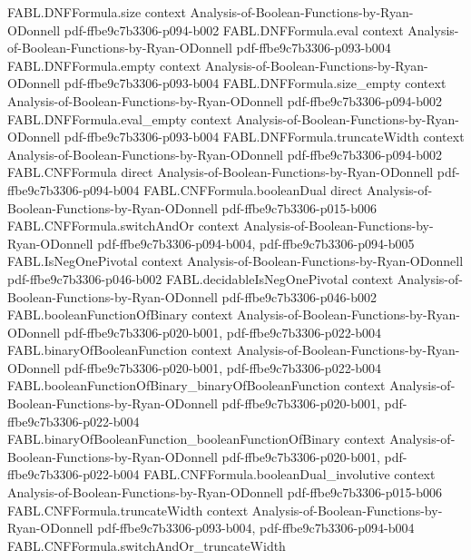 \begin{theorem}
\proofstep
  {FABL.DNFFormula.size}
  {context}
  {Analysis-of-Boolean-Functions-by-Ryan-ODonnell}
  {pdf-ffbe9c7b3306-p094-b002}
\proofstep
  {FABL.DNFFormula.eval}
  {context}
  {Analysis-of-Boolean-Functions-by-Ryan-ODonnell}
  {pdf-ffbe9c7b3306-p093-b004}
\proofstep
  {FABL.DNFFormula.empty}
  {context}
  {Analysis-of-Boolean-Functions-by-Ryan-ODonnell}
  {pdf-ffbe9c7b3306-p093-b004}
\proofstep
  {FABL.DNFFormula.size_empty}
  {context}
  {Analysis-of-Boolean-Functions-by-Ryan-ODonnell}
  {pdf-ffbe9c7b3306-p094-b002}
\proofstep
  {FABL.DNFFormula.eval_empty}
  {context}
  {Analysis-of-Boolean-Functions-by-Ryan-ODonnell}
  {pdf-ffbe9c7b3306-p093-b004}
\proofstep
  {FABL.DNFFormula.truncateWidth}
  {context}
  {Analysis-of-Boolean-Functions-by-Ryan-ODonnell}
  {pdf-ffbe9c7b3306-p094-b002}
\proofstep
  {FABL.CNFFormula}
  {direct}
  {Analysis-of-Boolean-Functions-by-Ryan-ODonnell}
  {pdf-ffbe9c7b3306-p094-b004}
\proofstep
  {FABL.CNFFormula.booleanDual}
  {direct}
  {Analysis-of-Boolean-Functions-by-Ryan-ODonnell}
  {pdf-ffbe9c7b3306-p015-b006}
\proofstep
  {FABL.CNFFormula.switchAndOr}
  {context}
  {Analysis-of-Boolean-Functions-by-Ryan-ODonnell}
  {pdf-ffbe9c7b3306-p094-b004,
    pdf-ffbe9c7b3306-p094-b005}
\proofstep
  {FABL.IsNegOnePivotal}
  {context}
  {Analysis-of-Boolean-Functions-by-Ryan-ODonnell}
  {pdf-ffbe9c7b3306-p046-b002}
\proofstep
  {FABL.decidableIsNegOnePivotal}
  {context}
  {Analysis-of-Boolean-Functions-by-Ryan-ODonnell}
  {pdf-ffbe9c7b3306-p046-b002}
\proofstep
  {FABL.booleanFunctionOfBinary}
  {context}
  {Analysis-of-Boolean-Functions-by-Ryan-ODonnell}
  {pdf-ffbe9c7b3306-p020-b001,
    pdf-ffbe9c7b3306-p022-b004}
\proofstep
  {FABL.binaryOfBooleanFunction}
  {context}
  {Analysis-of-Boolean-Functions-by-Ryan-ODonnell}
  {pdf-ffbe9c7b3306-p020-b001,
    pdf-ffbe9c7b3306-p022-b004}
\proofstep
  {FABL.booleanFunctionOfBinary_binaryOfBooleanFunction}
  {context}
  {Analysis-of-Boolean-Functions-by-Ryan-ODonnell}
  {pdf-ffbe9c7b3306-p020-b001,
    pdf-ffbe9c7b3306-p022-b004}
\proofstep
  {FABL.binaryOfBooleanFunction_booleanFunctionOfBinary}
  {context}
  {Analysis-of-Boolean-Functions-by-Ryan-ODonnell}
  {pdf-ffbe9c7b3306-p020-b001,
    pdf-ffbe9c7b3306-p022-b004}
\proofstep
  {FABL.CNFFormula.booleanDual_involutive}
  {context}
  {Analysis-of-Boolean-Functions-by-Ryan-ODonnell}
  {pdf-ffbe9c7b3306-p015-b006}
\proofstep
  {FABL.CNFFormula.truncateWidth}
  {context}
  {Analysis-of-Boolean-Functions-by-Ryan-ODonnell}
  {pdf-ffbe9c7b3306-p093-b004,
    pdf-ffbe9c7b3306-p094-b004}
\proofstep
  {FABL.CNFFormula.switchAndOr_truncateWidth}

\end{theorem}
